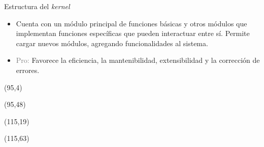 \documentclass[aspectratio=169]{beamer}
\begin{document}
\begin{frame}{Estructura del \emph{kernel}}
\begin{textblock}{78}
{    \begin{itemize} \setlength\itemsep{-0.1cm}
    \item[] \scriptsize Cuenta con un módulo principal de funciones básicas y otros módulos que implementan funciones específicas que pueden interactuar entre sí.
    Permite cargar nuevos módulos, agregando funcionalidades al sistema.
    \item[] \scriptsize \textcolor{gray}{Pro:} Favorece la eficiencia, la mantenibilidad, extensibilidad y la corrección de errores.
    \end{itemize}
    }
    \end{textblock}
    \begin{textblock}{60}(95,4)   \end{textblock}
    \begin{textblock}{60}(95,48)  \end{textblock}
    \begin{textblock}{60}(115,19)  \end{textblock}
    \begin{textblock}{60}(115,63)  \end{textblock}
\end{frame}
\end{document}
